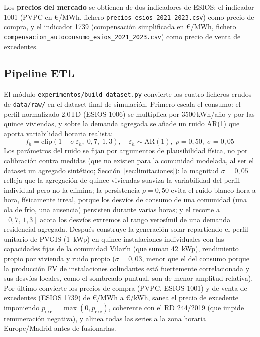 \documentclass[12pt, a4paper, twoside]{report}
\begin{document}
Los \textbf{precios del mercado} se obtienen de dos indicadores de ESIOS:
el indicador 1001 (PVPC en €/MWh, fichero \texttt{precios\_esios\_2021\_2023.csv})
como precio de compra, y el indicador 1739 (compensación simplificada en €/MWh,
fichero \texttt{compensacion\_autoconsumo\_esios\_2021\_2023.csv}) como precio
de venta de excedentes.

\subsection{Pipeline ETL}

El módulo \texttt{experimentos/build\_dataset.py} convierte los cuatro
ficheros crudos de \texttt{data/raw/} en el dataset final de simulación.
Primero escala el consumo: el perfil normalizado 2.0TD (ESIOS 1006) se
multiplica por 3500\,kWh/año y por las quince viviendas, y sobre la
demanda agregada se añade un ruido AR(1) que aporta variabilidad horaria
realista:
\begin{equation}
  f_h = \text{clip}(1 + \sigma\,\varepsilon_h,\; 0{,}7,\; 1{,}3),
  \quad \varepsilon_h \sim \text{AR}(1),\; \rho=0{,}50,\; \sigma=0{,}05
  \label{eq:ar1}
\end{equation}
Los parámetros del ruido se fijan por argumentos de plausibilidad física, no
por calibración contra medidas (que no existen para la comunidad modelada, al
ser el dataset un agregado sintético; Sección~\ref{sec:limitaciones}): la
magnitud $\sigma=0{,}05$ refleja que la agregación de quince viviendas suaviza
la variabilidad del perfil individual pero no la elimina; la persistencia
$\rho=0{,}50$ evita el ruido blanco hora a hora, físicamente irreal, porque
los desvíos de consumo de una comunidad (una ola de frío, una ausencia)
persisten durante varias horas; y el recorte a $[0{,}7,\,1{,}3]$ acota los
desvíos extremos al rango verosímil de una demanda residencial agregada.
Después construye la generación solar repartiendo el perfil unitario de PVGIS
(\SI{1}{kWp}) en quince instalaciones individuales con las capacidades fijas de
la comunidad Vilarín (que suman \SI{42}{kWp}), rendimiento propio por vivienda y
ruido propio ($\sigma=0{,}03$, menor que el del consumo porque la producción
FV de instalaciones colindantes está fuertemente correlacionada y sus desvíos
locales, como el sombreado puntual, son de menor amplitud relativa). Por último convierte los precios de compra
(PVPC, ESIOS 1001) y de venta de excedentes (ESIOS 1739) de €/MWh a €/kWh,
sanea el precio de excedente imponiendo
$p_{\text{exc}} = \max(0, p_{\text{exc}})$, coherente con el RD 244/2019 (que
impide remuneración negativa), y alinea todas las series a la zona horaria
Europe/Madrid antes de fusionarlas.
\end{document}
